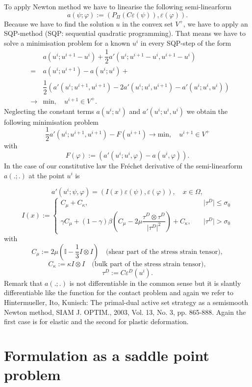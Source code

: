 \documentclass{article}
\begin{document}
To apply Newton method we have to linearise the following semi-linearform
$$a(\psi;\varphi) :=
\left(P_{\Pi}(C\varepsilon(\psi)),\varepsilon(\varphi)\right).$$ Because we have
to find the solution $u$ in the convex set $V^+$, we have to apply an SQP-method (SQP: sequential quadratic programming). That means we have
to solve a minimisation problem for a known $u^i$ in every SQP-step of the form
\begin{eqnarray*}
 & & a(u^{i};u^{i+1} - u^i) + \dfrac{1}{2}a'(u^i;u^{i+1} - u^i,u^{i+1} - u^i)\\
 &=&  a(u^i;u^{i+1}) -  a(u^i;u^i) +\\
 & & \dfrac{1}{2}\left( a'(u^i;u^{i+1},u^{i+1}) - 2a'(u^i;u^i,u^{i+1}) - a'(u^i;u^i,u^i)\right)\\
 &\rightarrow& \textrm{min},\quad u^{i+1}\in V^+.
\end{eqnarray*}
Neglecting the constant terms $ a(u^i;u^i)$ and $ a'(u^i;u^i,u^i)$ we obtain the
following minimisation problem $$\dfrac{1}{2} a'(u^i;u^{i+1},u^{i+1}) -
F(u^{i+1})\rightarrow \textrm{min},\quad u^{i+1}\in V^+$$ with $$F(\varphi) :=
\left(a'(u^{i};u^{i},\varphi) -  a(u^{i},\varphi) \right).$$
In the case of our constitutive law the Fr\'echet derivative of the
semi-linearform $a(.;.)$ at the point $u^i$ is

$$a'(u^i;\psi,\varphi) =
(I(x)\varepsilon(\psi),\varepsilon(\varphi)),\quad x\in\Omega,$$ $$
I(x) := \begin{cases}
C_{\mu} + C_{\kappa}, &
\quad \vert \tau^D \vert \leq \sigma_0\\
\gamma C_{\mu} + (1-\gamma)\beta\left(C_{\mu} -
2\mu\dfrac{\tau^D\otimes\tau^D}{\vert\tau^D\vert^2}\right) + C_{\kappa}, &\quad
\vert \tau^D \vert > \sigma_0
\end{cases}
$$
with
$$C_{\mu} := 2\mu\left(\mathbb{I}  - \dfrac{1}{3} I\otimes
I\right)\quad\text{(shear part of the stress strain tensor)},$$
$$C_{\kappa} := \kappa I\otimes I\quad\text{(bulk part of the stress strain
tensor)},$$
$$\tau^D := C\varepsilon^D(u^i).$$
Remark that $a(.;.)$ is not differentiable in the common sense but it is
slantly differentiable like the function for the contact problem and again we refer to
Hintermueller, Ito, Kunisch: The primal-dual active set strategy as a semismooth Newton method, SIAM J. OPTIM., 2003, Vol. 13, No. 3, pp. 865-888.
Again the first case is for elastic and the second for plastic deformation.

\section{Formulation as a saddle point problem}
\end{document}
